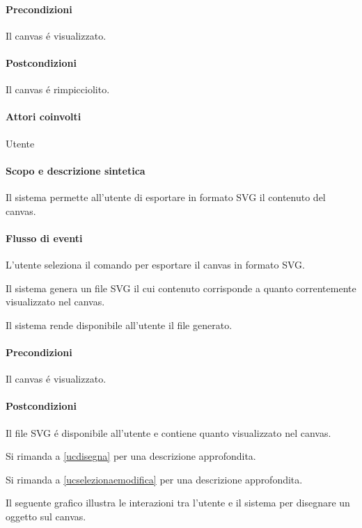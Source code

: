 \paragraph{Precondizioni} Il canvas \'e visualizzato.
\paragraph{Postcondizioni} Il canvas \'e rimpicciolito.

\paragraph{Attori coinvolti} Utente
\paragraph{Scopo e descrizione sintetica} 
Il sistema permette all'utente di esportare in formato SVG il contenuto del canvas.
\paragraph{Flusso di eventi}
\begin{elenconumerato}[\textbf{}]{\subsubsecindent}
\item L'utente seleziona il comando per esportare il canvas in formato SVG.
\item Il sistema genera un file SVG il cui contenuto corrisponde a quanto correntemente visualizzato nel canvas.
\item Il sistema rende disponibile all'utente il file generato.
\end{elenconumerato}
\paragraph{Precondizioni} Il canvas \'e visualizzato.
\paragraph{Postcondizioni} Il file SVG \'e disponibile all'utente e contiene quanto visualizzato nel canvas.

Si rimanda a \ref{ucdisegna} per una descrizione approfondita.

Si rimanda a \ref{ucselezionaemodifica} per una descrizione approfondita.

\label{ucdisegna}
Il seguente grafico illustra le interazioni tra l'utente e il sistema per disegnare un oggetto sul canvas.
\label{ucdisegna}

